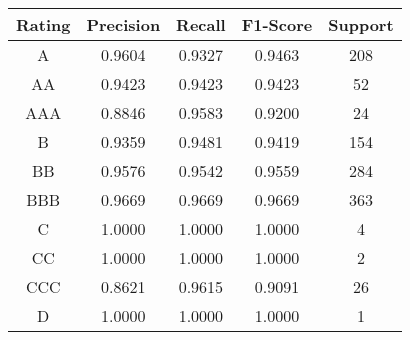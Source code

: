 \footnotesize
\begin{tabular}{ccccc}
\toprule
Rating & Precision & Recall & F1-Score & Support \\
\midrule
A & 0.9604 & 0.9327 & 0.9463 & 208 \\
AA & 0.9423 & 0.9423 & 0.9423 & 52 \\
AAA & 0.8846 & 0.9583 & 0.9200 & 24 \\
B & 0.9359 & 0.9481 & 0.9419 & 154 \\
BB & 0.9576 & 0.9542 & 0.9559 & 284 \\
BBB & 0.9669 & 0.9669 & 0.9669 & 363 \\
C & 1.0000 & 1.0000 & 1.0000 & 4 \\
CC & 1.0000 & 1.0000 & 1.0000 & 2 \\
CCC & 0.8621 & 0.9615 & 0.9091 & 26 \\
D & 1.0000 & 1.0000 & 1.0000 & 1 \\
\bottomrule
\end{tabular}

\normalsize